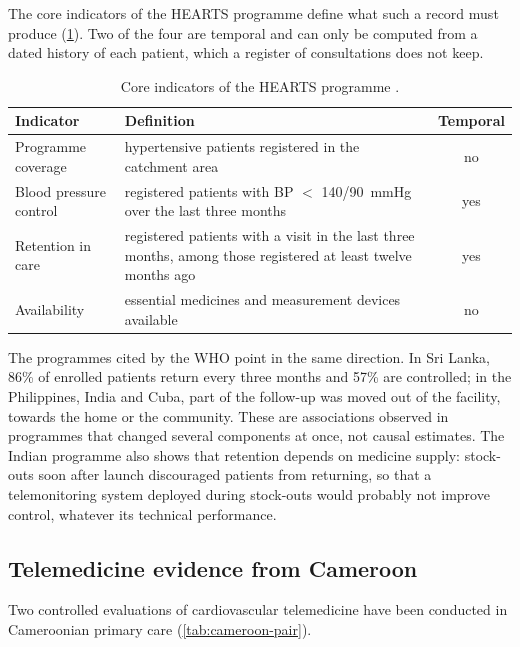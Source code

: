 \documentclass[11pt,a4paper,oneside]{report}
\begin{document}
The core indicators of the HEARTS programme define what such a record must produce (\cref{tab:hearts}). Two of the four are temporal and can only be computed from a dated history of each patient, which a register of consultations does not keep.

\begin{table}[htbp]
\centering\small
\caption{Core indicators of the HEARTS programme \parencite{who2023hypertension}.}\label{tab:hearts}
\begin{tabularx}{\textwidth}{@{}>{\raggedright\arraybackslash}p{3.6cm} X c@{}}
\toprule
\textbf{Indicator} & \textbf{Definition} & \textbf{Temporal} \\
\midrule
Programme coverage & hypertensive patients registered in the catchment area & no \\
Blood pressure control & registered patients with BP $<$ 140/90~mmHg over the last three months & yes \\
Retention in care & registered patients with a visit in the last three months, among those registered at least twelve months ago & yes \\
Availability & essential medicines and measurement devices available & no \\
\bottomrule
\end{tabularx}
\end{table}

The programmes cited by the WHO point in the same direction. In Sri Lanka, 86\% of enrolled patients return every three months and 57\% are controlled; in the Philippines, India and Cuba, part of the follow-up was moved out of the facility, towards the home or the community. These are associations observed in programmes that changed several components at once, not causal estimates. The Indian programme also shows that retention depends on medicine supply: stock-outs soon after launch discouraged patients from returning, so that a telemonitoring system deployed during stock-outs would probably not improve control, whatever its technical performance.

\subsection{Telemedicine evidence from Cameroon}\label{sec:telemedcam}\label{sec:bediang}\label{sec:cameroon-joint}

Two controlled evaluations of cardiovascular telemedicine have been conducted in Cameroonian primary care (\cref{tab:cameroon-pair}).
\end{document}
